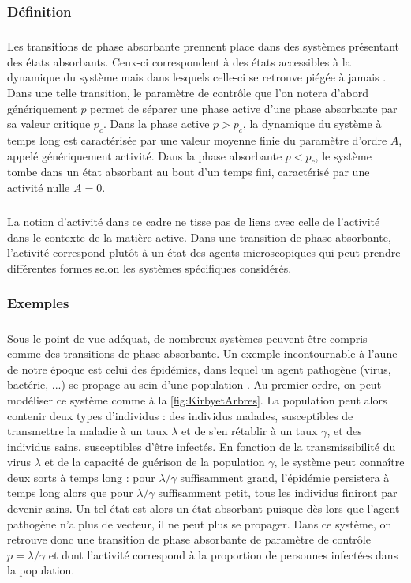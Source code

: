 \subsubsection{Définition}

\subparagraph{}Les transitions de phase absorbante prennent place dans des systèmes présentant des états absorbants. Ceux-ci correspondent à des états accessibles à la dynamique du système mais dans lesquels celle-ci se retrouve piégée à jamais \cite{lubeck_universal_2004}. Dans une telle transition, le paramètre de contrôle que l'on notera d'abord génériquement $p$ permet de séparer une phase active d'une phase absorbante par sa valeur critique $p_c$. Dans la phase active $p>p_c$, la dynamique du système à temps long est caractérisée par une valeur moyenne finie du paramètre d'ordre $A$, appelé génériquement activité. Dans la phase absorbante $p<p_c$, le système tombe dans un état absorbant au bout d'un temps fini, caractérisé par une activité nulle $A=0$. 

\subparagraph{}La notion d'activité dans ce cadre ne tisse pas de liens avec celle de l'activité dans le contexte de la matière active. Dans une transition de phase absorbante, l'activité correspond plutôt à un état des agents microscopiques qui peut prendre différentes formes selon les systèmes spécifiques considérés.

\subsubsection{Exemples}

\subparagraph{}Sous le point de vue adéquat, de nombreux systèmes peuvent être compris comme des transitions de phase absorbante. Un exemple incontournable à l'aune de notre époque est celui des épidémies, dans lequel un agent pathogène (virus, bactérie, ...) se propage au sein d'une population \cite{hinrichsen_non_equilibrium_2000, dickman_nonequilibrium_2002, lubeck_universal_2004}. Au premier ordre, on peut modéliser ce système comme à la \autoref{fig:KirbyetArbres}. La population peut alors contenir deux types d'individus : des individus malades, susceptibles de transmettre la maladie à un taux $\lambda$ et de s'en rétablir à un taux $\gamma$, et des individus sains, susceptibles d'être infectés. En fonction de la transmissibilité du virus $\lambda$ et de la capacité de guérison de la population $\gamma$, le système peut connaître deux sorts à temps long : pour $\lambda/\gamma$ suffisamment grand, l'épidémie persistera à temps long alors que pour $\lambda/\gamma$ suffisamment petit, tous les individus finiront par devenir sains. Un tel état est alors un état absorbant puisque dès lors que l'agent pathogène n'a plus de vecteur, il ne peut plus se propager. Dans ce système, on retrouve donc une transition de phase absorbante de paramètre de contrôle $p = \lambda/\gamma$ et dont l'activité correspond à la proportion de personnes infectées dans la population.

